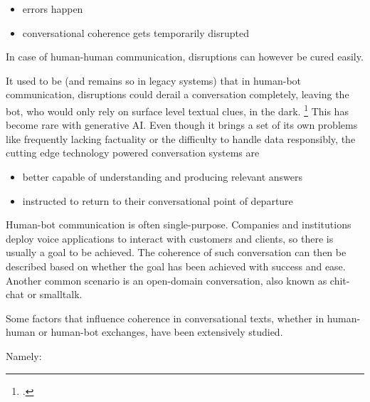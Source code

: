 \documentclass[12pt]{report}
\begin{document}
\begin{itemize}
\item
errors happen
\item
conversational coherence gets temporarily disrupted
\end{itemize}

In case of human-human communication, disruptions can however be cured easily.

\par
It used to be (and remains so in legacy systems)
that in human-bot communication, disruptions could derail a conversation completely,
leaving the bot, who would only rely on surface level textual clues, in the dark. \footcite{mctear2020conversational}
This has become rare with generative AI.
Even though it brings a set of its own problems like
frequently lacking factuality or
the difficulty to handle data responsibly,
the cutting edge technology powered conversation systems are

\begin{itemize}

\item
   better capable of understanding and producing relevant answers

\item
   instructed to return to their conversational point of departure
\end{itemize}

\par
Human-bot communication is often single-purpose.
Companies and institutions deploy voice applications to interact with customers and clients,
so there is usually a goal to be achieved.
The coherence of such conversation can then be described based on whether
the goal has been achieved with success and ease.
Another common scenario is an open-domain conversation,
also known as chit-chat or smalltalk.

\par
Some factors that influence coherence in conversational texts,
whether in human-human or human-bot exchanges,
have been extensively studied.
\par
Namely:
\end{document}
